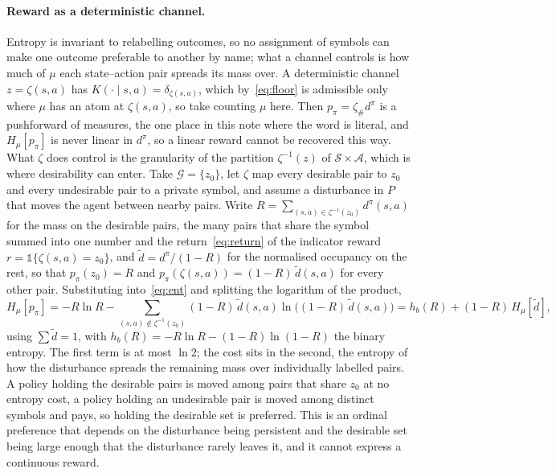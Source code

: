 \documentclass[11pt]{article}
\theoremstyle{remark}
\newcommand{\Acal}{\mathcal A}
\newcommand{\Scal}{\mathcal S}
\newcommand{\Gcal}{\mathcal G}
\newcommand{\1}{\mathds{1}}
\newcommand{\occ}{d^{\pi}}
\newcommand{\pz}{p_{\pi}}
\newcommand{\Hf}[1]{H_{\mu}\!\left[#1\right]}
\newcommand{\new}[1]{\textcolor{blue!70!black}{#1}}
\begin{document}
\paragraph{Reward as a deterministic channel.}
Entropy is invariant to relabelling outcomes, so no assignment of symbols can make one outcome preferable to another by name; what a channel controls is how much of $\mu$ each state--action pair spreads its mass over.
A deterministic channel $z=\zeta(s,a)$ has $K(\cdot\mid s,a)=\delta_{\zeta(s,a)}$, \new{which by~\eqref{eq:floor} is admissible only where $\mu$ has an atom at $\zeta(s,a)$, so take counting $\mu$ here.}
Then $\pz=\zeta_{\#}\occ$ is a pushforward of measures, \new{the one place in this note where the word is literal,} and $\Hf{\pz}$ is never linear in $\occ$, so a linear reward cannot be recovered this way.
What $\zeta$ does control is the granularity of the partition $\zeta^{-1}(z)$ of $\Scal\times\Acal$, which is where desirability can enter.
Take $\Gcal=\{z_0\}$, let $\zeta$ map every desirable pair to $z_0$ and every undesirable pair to a private symbol, and assume a disturbance in $P$ that moves the agent between nearby pairs.
Write $R=\sum_{(s,a)\in\zeta^{-1}(z_0)}\occ(s,a)$ for the mass on the desirable pairs, the many pairs that share the symbol summed into one number and the return~\eqref{eq:return} of the indicator reward $r=\1\{\zeta(s,a)=z_0\}$, and $\tilde d=\occ/(1-R)$ for the normalised occupancy on the rest, so that $\pz(z_0)=R$ and $\pz(\zeta(s,a))=(1-R)\,\tilde d(s,a)$ for every other pair.
Substituting into~\eqref{eq:ent} and splitting the logarithm of the product,
\begin{equation}
  \Hf{\pz}
  =-R\ln R-\sum_{(s,a)\notin\zeta^{-1}(z_0)}(1-R)\,\tilde d(s,a)\ln\big((1-R)\,\tilde d(s,a)\big)
  =h_b(R)+(1-R)\,\Hf{\tilde d},
  \label{eq:det-channel-entropy}
\end{equation}
using $\sum\tilde d=1$, with $h_b(R)=-R\ln R-(1-R)\ln(1-R)$ the binary entropy.
The first term is at most $\ln2$; the cost sits in the second, the entropy of how the disturbance spreads the remaining mass over individually labelled pairs.
A policy holding the desirable pairs is moved among pairs that share $z_0$ at no entropy cost, a policy holding an undesirable pair is moved among distinct symbols and pays, so holding the desirable set is preferred.
This is an ordinal preference that depends on the disturbance being persistent and the desirable set being large enough that the disturbance rarely leaves it, and it cannot express a continuous reward.
\end{document}
